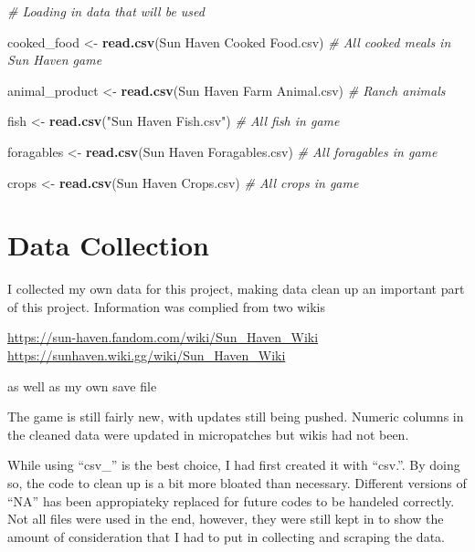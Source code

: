 \documentclass[
]{article}
\newenvironment{Shaded}{\begin{snugshade}}{\end{snugshade}}
\newcommand{\CommentTok}[1]{\textcolor[rgb]{0.56,0.35,0.01}{\textit{#1}}}
\newcommand{\FunctionTok}[1]{\textcolor[rgb]{0.13,0.29,0.53}{\textbf{#1}}}
\newcommand{\NormalTok}[1]{#1}
\newcommand{\OtherTok}[1]{\textcolor[rgb]{0.56,0.35,0.01}{#1}}
\newcommand{\StringTok}[1]{\textcolor[rgb]{0.31,0.60,0.02}{#1}}
\begin{document}
\begin{Shaded}
\begin{Highlighting}[]
\CommentTok{\# Loading in data that will be used}

\NormalTok{cooked\_food }\OtherTok{\textless{}{-}} \FunctionTok{read.csv}\NormalTok{(}\StringTok{\textquotesingle{}Sun Haven Cooked Food.csv\textquotesingle{}}\NormalTok{) }\CommentTok{\# All cooked meals in Sun Haven game}

\NormalTok{animal\_product }\OtherTok{\textless{}{-}} \FunctionTok{read.csv}\NormalTok{(}\StringTok{\textquotesingle{}Sun Haven Farm Animal.csv\textquotesingle{}}\NormalTok{) }\CommentTok{\# Ranch animals}

\NormalTok{fish }\OtherTok{\textless{}{-}} \FunctionTok{read.csv}\NormalTok{(}\StringTok{"Sun Haven Fish.csv"}\NormalTok{) }\CommentTok{\# All fish in game}

\NormalTok{foragables }\OtherTok{\textless{}{-}} \FunctionTok{read.csv}\NormalTok{(}\StringTok{\textquotesingle{}Sun Haven Foragables.csv\textquotesingle{}}\NormalTok{) }\CommentTok{\# All foragables in game}

\NormalTok{crops }\OtherTok{\textless{}{-}} \FunctionTok{read.csv}\NormalTok{(}\StringTok{\textquotesingle{}Sun Haven Crops.csv\textquotesingle{}}\NormalTok{)  }\CommentTok{\# All crops in game}
\end{Highlighting}
\end{Shaded}

\section{Data Collection}\label{data-collection}

I collected my own data for this project, making data clean up an
important part of this project. Information was complied from two wikis

\url{https://sun-haven.fandom.com/wiki/Sun_Haven_Wiki}
\url{https://sunhaven.wiki.gg/wiki/Sun_Haven_Wiki}

as well as my own save file

The game is still fairly new, with updates still being pushed. Numeric
columns in the cleaned data were updated in micropatches but wikis had
not been.

While using ``csv\_'' is the best choice, I had first created it with
``csv.''. By doing so, the code to clean up is a bit more bloated than
necessary. Different versions of ``NA'' has been appropiateky replaced
for future codes to be handeled correctly. Not all files were used in
the end, however, they were still kept in to show the amount of
consideration that I had to put in collecting and scraping the data.
\end{document}
